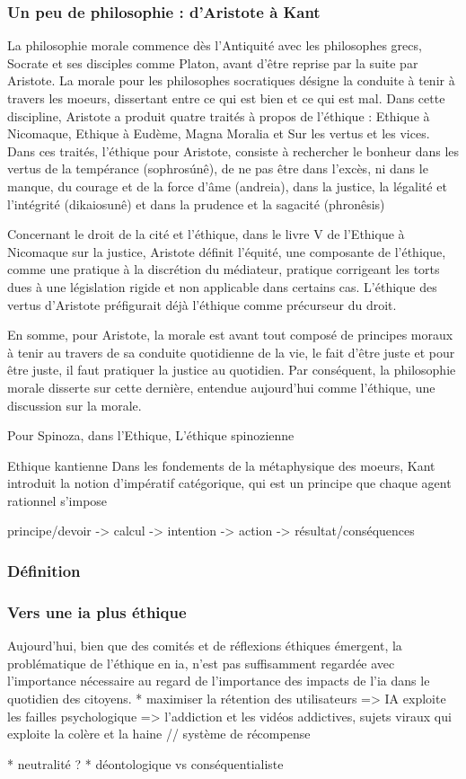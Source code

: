 \subsubsection{Un peu de philosophie : d'Aristote à Kant}

La philosophie morale commence dès l'Antiquité avec les philosophes grecs, Socrate et ses disciples comme Platon, avant d'être reprise par la suite par Aristote. La morale pour les philosophes socratiques désigne la conduite à tenir à travers les moeurs, dissertant entre ce qui est bien et ce qui est mal. Dans cette discipline, Aristote a produit quatre traités à propos de l'éthique : Ethique à Nicomaque, Ethique à Eudème, Magna Moralia et Sur les vertus et les vices. Dans ces traités, l'éthique pour Aristote, consiste à rechercher le bonheur dans les vertus de la tempérance (sophrosúnê), de ne pas être dans l'excès, ni dans le manque, du courage et de la force d'âme (andreia), dans la justice, la légalité et l'intégrité (dikaiosunê) et dans la prudence et la sagacité (phronêsis)

Concernant le droit de la cité et l'éthique, dans le livre V de l'Ethique à Nicomaque sur la justice, Aristote définit l'équité, une composante de l'éthique, comme une pratique à la discrétion du médiateur, pratique corrigeant les torts dues à une législation rigide et non applicable dans certains cas. L'éthique des vertus d'Aristote préfigurait déjà l'éthique comme précurseur du droit.

En somme, pour Aristote, la morale est avant tout composé de principes moraux à tenir au travers de sa conduite quotidienne de la vie, le fait d'être juste et pour être juste, il faut pratiquer la justice au quotidien. Par conséquent, la philosophie morale disserte sur cette dernière, entendue aujourd'hui comme l'éthique, une discussion sur la morale.


Pour Spinoza, dans l'Ethique,
L'éthique spinozienne

Ethique kantienne
Dans les fondements de la métaphysique des moeurs, Kant introduit la notion d'impératif catégorique, qui est un principe que chaque agent rationnel s'impose


principe/devoir -> calcul -> intention -> action -> résultat/conséquences
\subsubsection{Définition}

\cite{ethique-cnil}
\subsubsection{Vers une \gls{ia} plus éthique}

Aujourd'hui, bien que des comités et de réflexions éthiques émergent, la problématique de l'éthique en \gls{ia}, n'est pas suffisamment regardée avec l'importance nécessaire au regard de l'importance des impacts de l'\gls{ia} dans le quotidien des citoyens.
* maximiser la rétention des utilisateurs => IA exploite les failles psychologique => l'addiction et les vidéos addictives, sujets viraux qui exploite la colère et la haine // système de récompense

* neutralité ?
* déontologique vs conséquentialiste